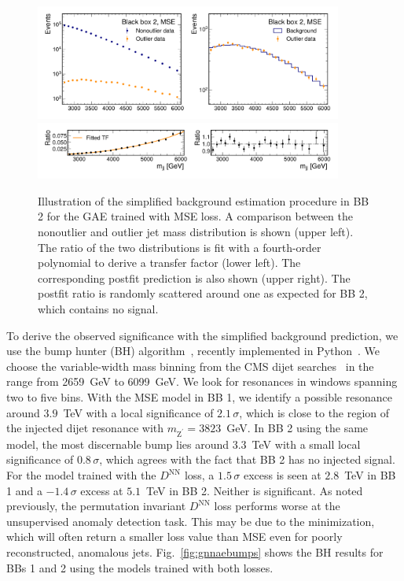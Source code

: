 \documentclass[letterpaper,11pt]{article}
\newcommand{\PZpr}{\ensuremath{\mathrm{Z}^{\prime}}\xspace} %
\begin{document}
\begin{figure}[htpb]
    \centering
    \includegraphics[width=0.9\textwidth]{figures/gae_mse/bb2_GNN_AE_EdgeConv_Finished_fit.pdf}\\
    \includegraphics[width=0.9\textwidth]{figures/gae_mse/bb2_GNN_AE_EdgeConv_Finished_fit_ratio.pdf}
    \caption{Illustration of the simplified background estimation procedure in BB 2 for the GAE trained with MSE loss. 
    A comparison between the nonoutlier and outlier jet mass distribution is shown (upper left). 
    The ratio of the two distributions is fit with a fourth-order polynomial to derive a transfer factor (lower left). 
    The corresponding postfit prediction is also shown (upper right). 
    The postfit ratio is randomly scattered around one as expected for BB 2, which contains no signal.}
    \label{fig:fit}
\end{figure}


To derive the observed significance with the simplified background prediction, we use the bump hunter (BH) algorithm~\cite{Choudalakis:2011qn}, recently implemented in Python~\cite{pybumphunter}.
We choose the variable-width mass binning from the CMS dijet searches~\cite{Sirunyan:2018xlo} in the range from 2659~GeV to 6099~GeV.
We look for resonances in windows spanning two to five bins.
With the MSE model in BB 1, we identify a possible resonance around $3.9$~TeV with a local significance of $2.1\,\sigma$, which is close to the region of the injected dijet resonance with $m_\PZpr=3823$~GeV.
In BB 2 using the same model, the most discernable bump lies around $3.3$~TeV with a small local significance of $0.8\,\sigma$, which agrees with the fact that BB 2 has no injected signal. 
For the model trained with the $D^\mathrm{NN}$ loss, a $1.5\,\sigma$ excess is seen at $2.8$~TeV in BB 1 and a $-1.4\,\sigma$ excess at $5.1$~TeV in BB 2. 
Neither is significant.
As noted previously, the permutation invariant $D^\mathrm{NN}$ loss performs worse at the unsupervised anomaly detection task.
This may be due to the minimization, which will often return a smaller loss value than MSE even for poorly reconstructed, anomalous jets.
Fig.~\ref{fig:gnnaebumps} shows the BH results for BBs 1 and 2 using the models trained with both losses.
\end{document}
